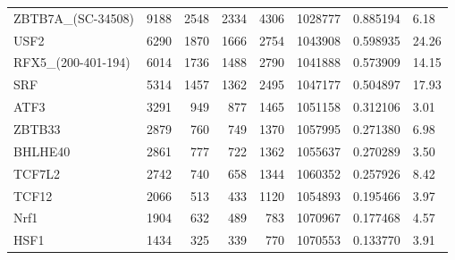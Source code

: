 \begin{table}
\begin{tabular}{lrrrrrrl}
ZBTB7A\_(SC-34508) & 9188 & 2548 & 2334 & 4306 & 1028777 & 0.885194 & 6.18 \\
USF2 & 6290 & 1870 & 1666 & 2754 & 1043908 & 0.598935 & 24.26 \\
RFX5\_(200-401-194) & 6014 & 1736 & 1488 & 2790 & 1041888 & 0.573909 & 14.15 \\
SRF & 5314 & 1457 & 1362 & 2495 & 1047177 & 0.504897 & 17.93 \\
ATF3 & 3291 & 949 & 877 & 1465 & 1051158 & 0.312106 & 3.01 \\
ZBTB33 & 2879 & 760 & 749 & 1370 & 1057995 & 0.271380 & 6.98 \\
BHLHE40 & 2861 & 777 & 722 & 1362 & 1055637 & 0.270289 & 3.50 \\
TCF7L2 & 2742 & 740 & 658 & 1344 & 1060352 & 0.257926 & 8.42 \\
TCF12 & 2066 & 513 & 433 & 1120 & 1054893 & 0.195466 & 3.97 \\
Nrf1 & 1904 & 632 & 489 & 783 & 1070967 & 0.177468 & 4.57 \\
HSF1 & 1434 & 325 & 339 & 770 & 1070553 & 0.133770 & 3.91 \\
\bottomrule
\end{tabular}
\end{table}
